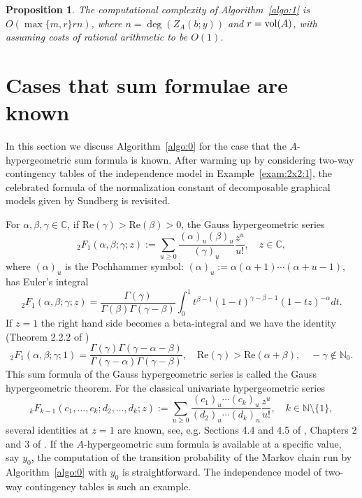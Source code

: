 \documentclass[a4paper,12pt]{article}
\theoremstyle{plain}
\newtheorem{proposition}[theorem]{Proposition}
\theoremstyle{remark}
\begin{document}
\begin{proposition}\label{prop:cost}
  The computational complexity of Algorithm~\ref{algo:1} is
  $O(\max\{m,r\}rn)$, where $n=\deg(Z_A(b;y))$ and $r={\rm vol}(A)$,
  with assuming costs of rational arithmetic to be $O(1)$.
\end{proposition}

\section{Cases that sum formulae are known}
\label{sect:sum}

In this section we discuss Algorithm~\ref{algo:0} for the case
that the $A$-hypergeometric sum formula is known. After
warming up by considering 
  two-way contingency tables of the independence model
in Example~\ref{exam:2x2:1}, the celebrated
formula of the normalization constant of decomposable
graphical models given by Sundberg \cite{Sun75} is revisited.

For $\alpha,\beta,\gamma\in\mathbb{C}$, if
$\text{Re}(\gamma)>\text{Re}(\beta)>0$, the Gauss hypergeometric
series
\begin{equation}
  {}_2F_1(\alpha,\beta;\gamma;z)
  :=\sum_{u\ge 0}\frac{(\alpha)_u(\beta)_u}{(\gamma)_u}\frac{z^u}{u!},
  \quad z\in\mathbb{C},
  \label{Ghyp}
\end{equation}
where $(\alpha)_u$ is the Pochhammer symbol:
$(\alpha)_u:=\alpha(\alpha+1)\cdots(\alpha+u-1)$, has Euler's
integral
\[
  {}_2F_1(\alpha,\beta;\gamma;z)=\frac{\Gamma(\gamma)}{\Gamma(\beta)
    \Gamma(\gamma-\beta)}
  \int_0^1t^{\beta-1}(1-t)^{\gamma-\beta-1}(1-tz)^{-\alpha}dt.
\]
If $z=1$ the right hand side becomes a beta-integral and we have
the identity (Theorem 2.2.2 of \cite{AAR96})
\begin{equation*}
  {}_2F_1(\alpha,\beta;\gamma;1)
  =\frac{\Gamma(\gamma)\Gamma(\gamma-\alpha-\beta)}
  {\Gamma(\gamma-\alpha)\Gamma(\gamma-\beta)},
  \quad \text{Re}(\gamma)>\text{Re}(\alpha+\beta),
  \quad -\gamma\notin \mathbb{N}_0.
\end{equation*}
This sum formula of the Gauss hypergeometric series is called
the Gauss hypergeometric theorem. For the classical univariate
hypergeometric series
\begin{equation}
  {}_kF_{k-1}(c_1,\ldots,c_k;d_2,\ldots,d_k;z)
  :=\sum_{u\ge 0}\frac{(c_1)_u\cdots(c_k)_u}
  {(d_2)_u\cdots(d_k)_u}\frac{z^u}{u!}, \quad
  k\in\mathbb{N}\setminus\{1\},
  \label{chyp}
\end{equation}
several identities at $z=1$ are known, see, e.g. Sections 4.4
and 4.5 of \cite{Erd53}, Chapters 2 and 3 of \cite{AAR96}.
If the $A$-hypergeometric sum formula is available at
a specific value, say $y_0$, the computation of the transition
probability of the Markov chain run by Algorithm~\ref{algo:0}
with $y_0$ is straightforward. The independence model of
two-way contingency tables is such an example.
\end{document}
